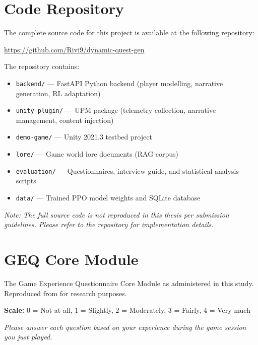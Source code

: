 \appendix

\chapter{Code Repository}
\label{app:code}

The complete source code for this project is available at the following repository:

\begin{center}
\url{https://github.com/Rivi9/dynamic-quest-gen}
\end{center}

The repository contains:
\begin{itemize}
\item \texttt{backend/} --- FastAPI Python backend (player modelling, narrative generation, RL adaptation)
\item \texttt{unity-plugin/} --- UPM package (telemetry collection, narrative management, content injection)
\item \texttt{demo-game/} --- Unity 2021.3 testbed project
\item \texttt{lore/} --- Game world lore documents (RAG corpus)
\item \texttt{evaluation/} --- Questionnaires, interview guide, and statistical analysis scripts
\item \texttt{data/} --- Trained PPO model weights and SQLite database
\end{itemize}

\textit{Note: The full source code is not reproduced in this thesis per submission guidelines. Please refer to the repository for implementation details.}


\chapter{GEQ Core Module}
\label{app:geq}

The Game Experience Questionnaire Core Module as administered in this study. Reproduced from \citet{ijsselsteijn2013geq} for research purposes.

\textbf{Scale:} 0 = Not at all, 1 = Slightly, 2 = Moderately, 3 = Fairly, 4 = Very much

\textit{Please answer each question based on your experience during the game session you just played.}

